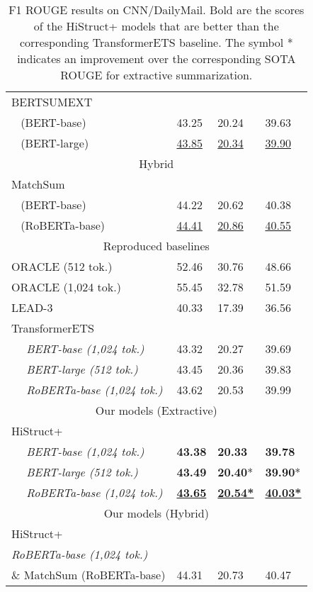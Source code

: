\documentclass[11pt]{article}
\begin{document}
\begin{table}[ht]
\begin{tabular}[t]{@{}llll@{}}
BERTSUMEXT \citeyearpar{presumm}  &  &  & \\
~ (BERT-base)  & 43.25 & 20.24 & 39.63 \\
~ (BERT-large) & \underline{43.85} & \underline{20.34} & \underline{39.90}  \\ 
\midrule
        \multicolumn{4}{c}{Hybrid}                      \\ \midrule
MatchSum \citeyearpar{zhong-etal-2020-extractive} &  &  & \\
~ (BERT-base)  & 44.22 & 20.62 & 40.38 \\
~ (RoBERTa-base) & \underline{44.41} & \underline{20.86} & \underline{40.55} \\ \midrule
\multicolumn{4}{c}{Reproduced baselines}                                                       \\ \midrule
ORACLE (512 tok.)              & 52.46  & 30.76  & 48.66  \\
ORACLE (1,024 tok.)               & 55.45  & 32.78  & 51.59  \\
LEAD-3                                & 40.33  & 17.39  & 36.56  \\
TransformerETS  & & & \\
~~ \textit{BERT-base (1,024 tok.)}          & 43.32  & 20.27  & 39.69    \\
~~ \textit{BERT-large (512 tok.) }           & 43.45  & 20.36  & 39.83    \\
~~ \textit{RoBERTa-base (1,024 tok.)}        & 43.62  & 20.53  & 39.99    \\ \midrule
\multicolumn{4}{c}{Our models (Extractive)}                                          \\ \midrule
HiStruct+  & & & \\
~~ \textit{BERT-base (1,024 tok.)} & \textbf{43.38}  & \textbf{20.33}  & \textbf{39.78}    \\
~~ \textit{BERT-large (512 tok.)}  & \textbf{43.49}  & \textbf{20.40}*  & \textbf{39.90}*  \\
~~ \textit{RoBERTa-base (1,024 tok.)}   & \underline{\textbf{43.65}} & \underline{\textbf{20.54*}} & \underline{\textbf{40.03*}}  \\ \midrule
\multicolumn{4}{c}{Our models (Hybrid)} \\ \midrule
HiStruct+ \\\textit{RoBERTa-base (1,024 tok.)}
\\ \& MatchSum (RoBERTa-base)
& 44.31 & 20.73  & 40.47  \\ \bottomrule
\end{tabular}
\caption[Results on CNN/DailyMail]{F1 ROUGE results on CNN/DailyMail. Bold are the scores of the HiStruct+ models that are better than the corresponding TransformerETS baseline. The symbol * indicates an improvement over the corresponding SOTA ROUGE for extractive summarization. }
\label{tab:cnndm_result}
\end{table}
\end{document}
